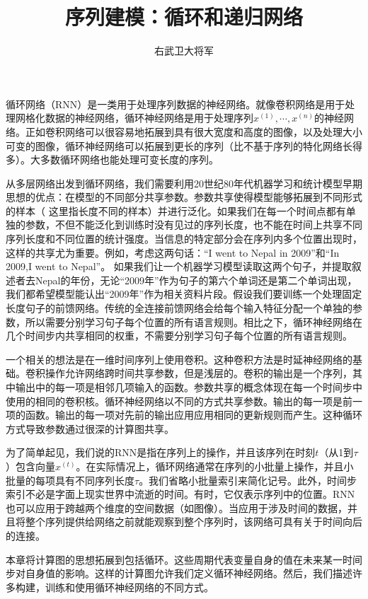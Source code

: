 \documentclass{ctexart}
\author{右武卫大将军}
\title{序列建模：循环和递归网络}
\begin{document}
    \maketitle
    循环网络（RNN）是一类用于处理序列数据的神经网络。就像卷积网络是用于处理网格化数据的神经网络，循环神经网络是用于处理序列$x^{(1)},\cdots,x^{(n)}$的神经网络。正如卷积网络可以很容易地拓展到具有很大宽度和高度的图像，以及处理大小可变的图像，循环神经网络可以拓展到更长的序列（比不基于序列的特化网络长得多）。大多数循环网络也能处理可变长度的序列。

    从多层网络出发到循环网络，我们需要利用20世纪80年代机器学习和统计模型早期思想的优点：在模型的不同部分共享参数。参数共享使得模型能够拓展到不同形式的样本（{\color{red} 这里指长度不同的样本}）并进行泛化。如果我们在每一个时间点都有单独的参数，不但不能泛化到训练时没有见过的序列长度，也不能在时间上共享不同序列长度和不同位置的统计强度。当信息的特定部分会在序列内多个位置出现时，这样的共享尤为重要。例如，考虑这两句话：“I went to Nepal in 2009”和“In 2009,I went to Nepal”。 如果我们让一个机器学习模型读取这两个句子，并提取叙述者去Nepal的年份，无论“2009年”作为句子的第六个单词还是第二个单词出现，我们都希望模型能认出“2009年”作为相关资料片段。假设我们要训练一个处理固定长度句子的前馈网络。传统的全连接前馈网络会给每个输入特征分配一个单独的参数，所以需要分别学习句子每个位置的所有语言规则。相比之下，循环神经网络在几个时间步内共享相同的权重，不需要分别学习句子每个位置的所有语言规则。

    一个相关的想法是在一维时间序列上使用卷积。这种卷积方法是时延神经网络的基础。卷积操作允许网络跨时间共享参数，但是浅层的。卷积的输出是一个序列，其中输出中的每一项是相邻几项输入的函数。参数共享的概念体现在每一个时间步中使用的相同的卷积核。循环神经网络以不同的方式共享参数。输出的每一项是前一项的函数。输出的每一项对先前的输出应用应用相同的更新规则而产生。这种循环方式导致参数通过很深的计算图共享。

    为了简单起见，我们说的RNN是指在序列上的操作，并且该序列在时刻$t$（从1到$\tau$）包含向量$x^{(t)}$。在实际情况上，循环网络通常在序列的小批量上操作，并且小批量的每项具有不同序列长度$\tau$。我们省略小批量索引来简化记号。此外，时间步索引不必是字面上现实世界中流逝的时间。有时，它仅表示序列中的位置。RNN也可以应用于跨越两个维度的空间数据（如图像）。当应用于涉及时间的数据，并且将整个序列提供给网络之前就能观察到整个序列时，该网络可具有关于时间向后的连接。

    本章将计算图的思想拓展到包括循环。这些周期代表变量自身的值在未来某一时间步对自身值的影响。这样的计算图允许我们定义循环神经网络。然后，我们描述许多构建，训练和使用循环神经网络的不同方式。
\end{document}
